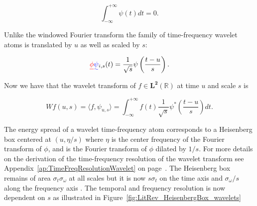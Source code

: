 \begin{equation}\label{eq:Mallat1999_4}
\int^{+\infty}_{-\infty} \psi(t) dt = 0.
\end{equation}

Unlike the windowed Fourier transform the family of time-frequency wavelet atoms is translated by $u$ as well as scaled by $s$:

\begin{equation}\label{eq:Mallat1999_5}
\DIFdelbegin \DIFdel{\phi}\DIFdelend \DIFaddbegin \DIFadd{\psi}\DIFaddend _{i,s}(t) = \frac{1}{\sqrt{s}}\psi\left(\frac{t-u}{s}\right).
\end{equation}

Now we have that the wavelet transform of $f \in \mathbf{L^2}(\mathbb{R})$ at time $u$ and scale $s$ is

\begin{equation}\label{eq:Mallat1999_x}
W f(u,s) = \langle f, \psi_{u,s} \rangle = \int^{+\infty}_{-\infty} f(t) \frac{1}{\sqrt{s}}\psi^\ast \left( \frac{t-u}{s} \right) dt.
\end{equation}

The energy spread of a wavelet time-frequency atom \DIFdelbegin {}\DIFdelend \DIFaddbegin {}\DIFaddend corresponds to a Heisenberg box centered at $(u,\eta/s)$ where $\eta$ is the center frequency of \DIFdelbegin \DIFdel{$\hat{\phi}$ }\DIFdelend \DIFaddbegin \DIFadd{$\hat{\psi}$ }\DIFaddend the Fourier transform of $\phi$, and \DIFdelbegin {}\DIFdelend \DIFaddbegin {}\DIFaddend is the Fourier transform of $\phi$ dilated by $1/s$. For more details on the derivation of the time-frequency resolution of the wavelet transform see Appendix~\ref{ap:TimeFreqResolutionWavelet} on page~\pageref{ap:TimeFreqResolutionWavelet}. The Heisenberg box remains of area $\sigma_t \sigma_\omega$ at all scales but it is now $s\sigma_t$ on the time axis and $\sigma_\omega /s$ along the frequency axis \cite{Mallat1999}. The temporal and frequency resolution is now dependent on $s$ as illustrated in Figure~\ref{fig:LitRev_HeisenbergBox_wavelets}

